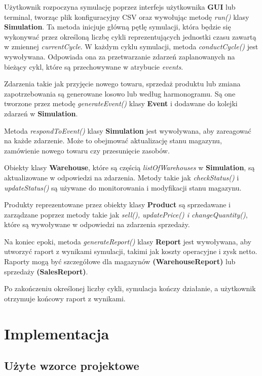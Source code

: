 \documentclass[11pt]{article}
\begin{document}
Użytkownik rozpoczyna symulację poprzez interfejs użytkownika \textbf{GUI} lub terminal, tworząc plik konfiguracyjny CSV oraz wywołując metodę \textit{run()} klasy \textbf{Simulation}. Ta metoda inicjuje główną pętlę symulacji, która będzie się wykonywać przez określoną liczbę cykli reprezentujących jednostki czasu zawartą w zmiennej \textit{currentCycle}. W każdym cyklu symulacji, metoda \textit{conductCycle()} jest wywoływana. Odpowiada ona za przetwarzanie zdarzeń zaplanowanych na bieżący cykl, które są przechowywane w atrybucie \textit{events}. \par
Zdarzenia takie jak przyjęcie nowego towaru, sprzedaż produktu lub zmiana zapotrzebowania są generowane losowo lub według harmonogramu. Są one tworzone przez metodę \textit{generateEvent()} klasy \textbf{Event} i dodawane do kolejki zdarzeń w \textbf{Simulation}.\par
Metoda \textit{respondToEvent()} klasy \textbf{Simulation} jest wywoływana, aby zareagować na każde zdarzenie. Może to obejmować aktualizację stanu magazynu, zamówienie nowego towaru czy przesunięcie zasobów.\par
Obiekty klasy \textbf{Warehouse}, które są częścią \textit{listOfWarehouses} w \textbf{Simulation}, są aktualizowane w odpowiedzi na zdarzenia. Metody takie jak \textit{checkStatus()} i \textit{updateStatus()} są używane do monitorowania i modyfikacji stanu magazynu.\par
Produkty reprezentowane przez obiekty klasy \textbf{Product} są sprzedawane i zarządzane poprzez metody takie jak \textit{sell(), updatePrice() i changeQuantity()}, które są wywoływane w odpowiedzi na zdarzenia sprzedaży.\par
Na koniec epoki, metoda \textit{generateReport()} klasy \textbf{Report} jest wywoływana, aby utworzyć raport z wynikami symulacji, takimi jak koszty operacyjne i zysk netto. Raporty mogą być szczegółowe dla magazynów \textbf{(WarehouseReport)} lub sprzedaży \textbf{(SalesReport)}.\par
Po zakończeniu określonej liczby cykli, symulacja kończy działanie, a użytkownik otrzymuje końcowy raport z wynikami.

\section{Implementacja}
\subsection{Użyte wzorce projektowe}
\end{document}
